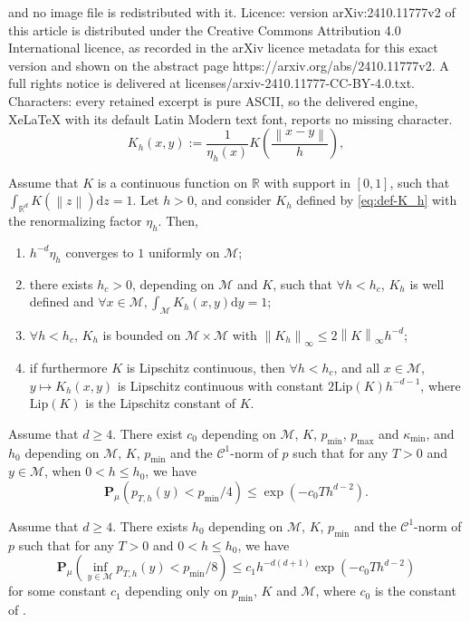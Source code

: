 \documentclass[10pt,a4paper]{amsart}
\newcommand\cC{\mathcal{C}}
\newcommand\cM{\mathcal{M}}
\newcommand\dR{\mathbb{R}}
\newcommand\dd{\mathrm{d}}
\newcommand{\NRM}[1]{{{\left\| #1\right\|}}} %
\newcommand{\PAR}[1]{{{\left(#1\right)}}} %
\renewcommand{\P}{{\mathbf P}}
\begin{document}
and no image file is redistributed with it. Licence: version arXiv:2410.11777v2 of this article is distributed under the Creative Commons Attribution 4.0 International licence, as recorded in the arXiv licence metadata for this exact version and shown on the abstract page https://arxiv.org/abs/2410.11777v2. A full rights notice is delivered at licenses/arxiv-2410.11777-CC-BY-4.0.txt. Characters: every retained excerpt is pure ASCII, so the delivered engine, XeLaTeX with its default Latin Modern text font, reports no missing character.
\begin{equation}\label{eq:def-K_h}
K_h(x,y):=\frac{1}{\eta_h(x)}K\PAR{\frac{\NRM{x-y}}{h}},
\end{equation}

\begin{lemma}\label{lem:properties-Kh}
Assume that $K$ is a continuous function on $\dR$ with support in $[0,1]$, such that $\int_{\dR^d}K(\NRM{z})\dd z=1$. Let $h>0$, and consider $K_h$ defined by \eqref{eq:def-K_h} with the renormalizing factor $\eta_h$. Then,
\begin{enumerate}[label=(\roman*)]
\item $h^{-d}\eta_h$ converges to $1$ uniformly on $\cM$;
\item {there exists $h_c>0$, depending on $\cM$ and $K$, such that $\forall h<h_c$, $K_h$ is well defined and} $\forall x\in \cM, \displaystyle{\int_\cM K_h(x,y)\dd y=1}$; 
\item  $\forall h<h_c$, $K_h$ is bounded on $\cM\times \cM$ with  $\NRM{K_h}_\infty\le 2\NRM{K}_\infty h^{-d}$;
\item if furthermore $K$ is Lipschitz continuous, then $\forall h<h_c$, and all $x\in \cM$,  $y\mapsto K_h(x,y)$ is Lipschitz continuous with constant $2\mathrm{Lip}(K)h^{-d-1}$, where $\mathrm{Lip}(K)$ is the Lipschitz constant of $K$.
\end{enumerate}
\end{lemma}

	\begin{proposition}\label{prop:bernstein} 
		Assume that $d\ge 4$. There exist $c_0 $ depending on $\cM$, $K$, $p_{\min}$, $p_{\max}$ and $\kappa_{\min}$, and $h_0$ depending on $\cM$, $K$, $p_{\min}$ and the $\cC^1$-norm of $p$ such that  for any $T>0$ and $y \in \cM$, when $0<h\le h_0$, we have
		$$\P_{\mu}\PAR{ p_{T,h}(y) <p_{\min}/4} \le \exp\PAR{- c_0 T h^{d-2} }.$$
	\end{proposition}

	\begin{proposition}\label{prop:proba-invariante-unif}
 Assume that $d\ge 4$. There exists $h_0$ depending on $\cM$, $K$,  $p_{\min}$ and  the $\cC^1$-norm of $p$ such that  for any $T>0$ and $0<h\le h_0$, we have
\[
 \P_{\mu}\PAR{\inf_{y\in \cM}p_{T,h}(y)<p_{\min}/8 } \le c_1 h^{-d(d+1)} \exp\PAR{- c_0 T h^{d-2} }
\]
for some constant $c_1$ depending only on $p_{\min}$, $K$ and $\cM$, where $c_0$ is the constant of .
	\end{proposition} 
\end{document}

